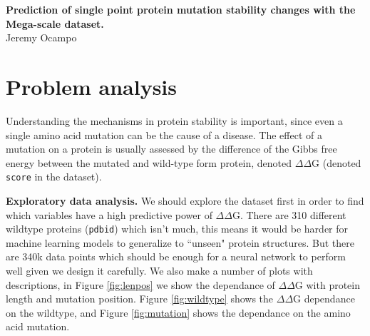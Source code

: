 \documentclass{article}
\newcommand{\dd}{$\Delta\Delta$}
\begin{document}
\vspace{-1cm}
\begin{center}
    \Large{\textbf{Prediction of single point protein mutation stability changes with the Mega-scale dataset.}} \\
    \vspace{0.5cm}
    Jeremy Ocampo
\end{center}

\section{Problem analysis}
Understanding the mechanisms in protein stability is important, since even a single amino acid mutation can be the cause of a disease. The effect of a mutation on a protein is usually assessed by the difference of the Gibbs free energy between the mutated and wild-type form protein, denoted $\Delta\Delta$G (denoted \texttt{score} in the dataset).

\textbf{Exploratory data analysis.} We should explore the dataset first in order to find which variables have a high predictive power of $\Delta\Delta$G. There are 310 different wildtype proteins (\texttt{pdbid}) which isn't much, this means it would be harder for machine learning models to generalize to ``unseen" protein structures. But there are 340k data points which should be enough for a neural network to perform well given we design it carefully. We also make a number of plots with descriptions, in Figure \ref{fig:lenpos} we show the dependance of \dd G with protein length and mutation position. Figure \ref{fig:wildtype} shows the \dd G dependance on the wildtype, and Figure \ref{fig:mutation} shows the dependance on the amino acid mutation.
\end{document}
